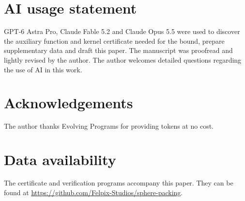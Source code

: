 \documentclass[11pt]{amsart}
\numberwithin{equation}{section}
\theoremstyle{remark}
\begin{document}
\section*{AI usage statement}

GPT-6 Astra Pro, Claude Fable 5.2 and Claude Opus 5.5 were used to discover the auxiliary function and kernel certificate needed for the bound, prepare supplementary data and draft this paper. The manuscript was proofread and lightly revised by the author. The author welcomes detailed questions regarding the use of AI in this work.

\section*{Acknowledgements}

The author thanks Evolving Programs for providing tokens at no cost.

\section*{Data availability}

The certificate and verification programs accompany this paper. They can be found at \url{https://github.com/Felpix-Studios/sphere-packing}.
\end{document}
